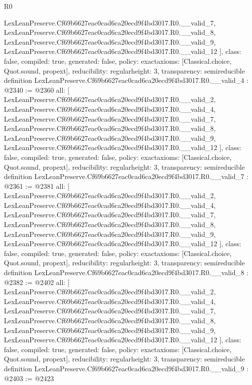 \begin{lexlean}{R0}
\begin{coremodule}
{    LexLeanPreserve.Cf69b6627eac0cad6ca20ecd9f4bd3017.R0.__valid_7,
    LexLeanPreserve.Cf69b6627eac0cad6ca20ecd9f4bd3017.R0.__valid_8,
    LexLeanPreserve.Cf69b6627eac0cad6ca20ecd9f4bd3017.R0.__valid_9,
    LexLeanPreserve.Cf69b6627eac0cad6ca20ecd9f4bd3017.R0.__valid_12
  ],
  class: false,
  compiled: true,
  generated: false,
  policy: exact{axioms: [Classical.choice, Quot.sound, propext]},
  reducibility: regular{height: 3},
  transparency: semireducible
}
definition LexLeanPreserve.Cf69b6627eac0cad6ca20ecd9f4bd3017.R0.__valid_4 : @2340 := @2360 {
  all: [
    LexLeanPreserve.Cf69b6627eac0cad6ca20ecd9f4bd3017.R0.__valid_2,
    LexLeanPreserve.Cf69b6627eac0cad6ca20ecd9f4bd3017.R0.__valid_4,
    LexLeanPreserve.Cf69b6627eac0cad6ca20ecd9f4bd3017.R0.__valid_7,
    LexLeanPreserve.Cf69b6627eac0cad6ca20ecd9f4bd3017.R0.__valid_8,
    LexLeanPreserve.Cf69b6627eac0cad6ca20ecd9f4bd3017.R0.__valid_9,
    LexLeanPreserve.Cf69b6627eac0cad6ca20ecd9f4bd3017.R0.__valid_12
  ],
  class: false,
  compiled: true,
  generated: false,
  policy: exact{axioms: [Classical.choice, Quot.sound, propext]},
  reducibility: regular{height: 3},
  transparency: semireducible
}
definition LexLeanPreserve.Cf69b6627eac0cad6ca20ecd9f4bd3017.R0.__valid_7 : @2361 := @2381 {
  all: [
    LexLeanPreserve.Cf69b6627eac0cad6ca20ecd9f4bd3017.R0.__valid_2,
    LexLeanPreserve.Cf69b6627eac0cad6ca20ecd9f4bd3017.R0.__valid_4,
    LexLeanPreserve.Cf69b6627eac0cad6ca20ecd9f4bd3017.R0.__valid_7,
    LexLeanPreserve.Cf69b6627eac0cad6ca20ecd9f4bd3017.R0.__valid_8,
    LexLeanPreserve.Cf69b6627eac0cad6ca20ecd9f4bd3017.R0.__valid_9,
    LexLeanPreserve.Cf69b6627eac0cad6ca20ecd9f4bd3017.R0.__valid_12
  ],
  class: false,
  compiled: true,
  generated: false,
  policy: exact{axioms: [Classical.choice, Quot.sound, propext]},
  reducibility: regular{height: 3},
  transparency: semireducible
}
definition LexLeanPreserve.Cf69b6627eac0cad6ca20ecd9f4bd3017.R0.__valid_8 : @2382 := @2402 {
  all: [
    LexLeanPreserve.Cf69b6627eac0cad6ca20ecd9f4bd3017.R0.__valid_2,
    LexLeanPreserve.Cf69b6627eac0cad6ca20ecd9f4bd3017.R0.__valid_4,
    LexLeanPreserve.Cf69b6627eac0cad6ca20ecd9f4bd3017.R0.__valid_7,
    LexLeanPreserve.Cf69b6627eac0cad6ca20ecd9f4bd3017.R0.__valid_8,
    LexLeanPreserve.Cf69b6627eac0cad6ca20ecd9f4bd3017.R0.__valid_9,
    LexLeanPreserve.Cf69b6627eac0cad6ca20ecd9f4bd3017.R0.__valid_12
  ],
  class: false,
  compiled: true,
  generated: false,
  policy: exact{axioms: [Classical.choice, Quot.sound, propext]},
  reducibility: regular{height: 3},
  transparency: semireducible
}
definition LexLeanPreserve.Cf69b6627eac0cad6ca20ecd9f4bd3017.R0.__valid_9 : @2403 := @2423 {
}
\end{coremodule}
\end{lexlean}

